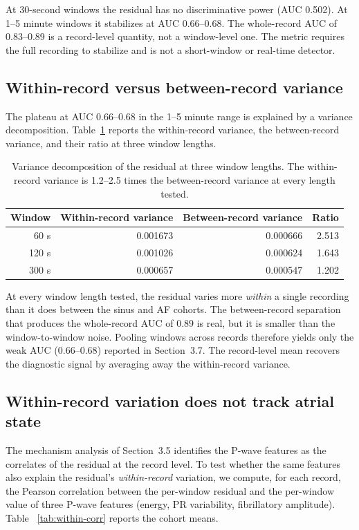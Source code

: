 \documentclass[11pt]{article}
\begin{document}
At 30-second windows the residual has no discriminative power
(AUC 0.502). At 1--5 minute windows it stabilizes at AUC
0.66--0.68. The whole-record AUC of 0.83--0.89 is a record-level
quantity, not a window-level one. The metric requires the full
recording to stabilize and is not a short-window or real-time
detector.

\subsection{Within-record versus between-record variance}

The plateau at AUC $0.66$--$0.68$ in the 1--5 minute range is
explained by a variance decomposition. Table~\ref{tab:var-decomp}
reports the within-record variance, the between-record variance, and
their ratio at three window lengths.

\begin{table}[h]
\centering
\begin{tabular}{rrrr}
\toprule
Window & Within-record variance & Between-record variance & Ratio \\
\midrule
60 s  & 0.001673 & 0.000666 & 2.513 \\
120 s & 0.001026 & 0.000624 & 1.643 \\
300 s & 0.000657 & 0.000547 & 1.202 \\
\bottomrule
\end{tabular}
\caption{Variance decomposition of the residual at three window
lengths. The within-record variance is 1.2--2.5 times the
between-record variance at every length tested.}
\label{tab:var-decomp}
\end{table}

At every window length tested, the residual varies more \emph{within} a
single recording than it does between the sinus and AF cohorts. The
between-record separation that produces the whole-record AUC of $0.89$
is real, but it is smaller than the window-to-window noise. Pooling
windows across records therefore yields only the weak AUC
($0.66$--$0.68$) reported in Section~3.7. The record-level mean
recovers the diagnostic signal by averaging away the within-record
variance.

\subsection{Within-record variation does not track atrial state}

The mechanism analysis of Section~3.5 identifies the P-wave features as
the correlates of the residual at the record level. To test whether
the same features also explain the residual's \emph{within-record}
variation, we compute, for each record, the Pearson correlation between
the per-window residual and the per-window value of three P-wave
features (energy, PR variability, fibrillatory amplitude). Table~
\ref{tab:within-corr} reports the cohort means.
\end{document}
